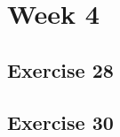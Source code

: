 \documentclass[a4paper]{article}
\let\stdsection\section
\renewcommand\section{\newpage\stdsection}
\begin{document}
\section*{Week 4}

\subsection*{Exercise 28}















\newpage
\subsection*{Exercise 30}


\newpage
\end{document}
